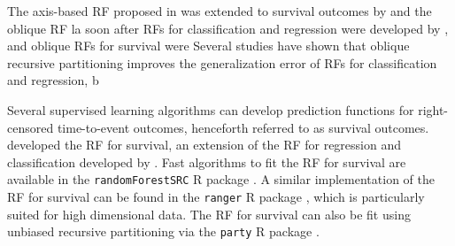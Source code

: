 \documentclass[twoside,11pt]{article}\usepackage[]{graphicx}\usepackage[]{color}
\newcommand{\eg}{for example}
\begin{document}
The axis-based RF proposed in \citet{breiman2001random} was extended to survival outcomes by \citet{ishwaran2008random} and the oblique RF  la soon after RFs for classification and regression were developed by \citet{breiman2001random}, and oblique RFs for survival were Several studies have shown that oblique recursive partitioning improves the generalization error of RFs for classification and regression, b




Several supervised learning algorithms can develop prediction functions for right-censored time-to-event outcomes, henceforth referred to as survival outcomes. \cite{ishwaran2008random} developed the RF for survival, an extension of the RF for regression and classification developed by \citet{breiman2001random}. Fast algorithms to fit the RF for survival are available in the \texttt{randomForestSRC} R package \citep{randomForestSRC}. A similar implementation of the RF for survival can be found in the \texttt{ranger} R package \citep{ranger}, which is particularly suited for high dimensional data. The RF for survival can also be fit using unbiased recursive partitioning \citep{cif} via the \texttt{party} R package \citep{hothorn2010party}.
\end{document}
